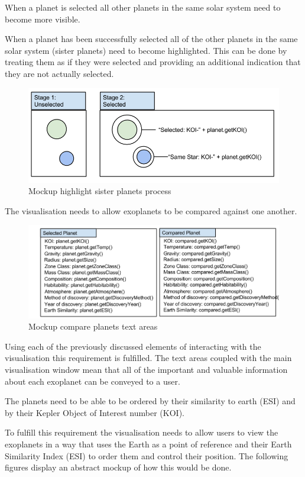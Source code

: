 \begin{enumerate}
When a planet is selected all other planets in the same solar system
need to become more visible.

When a planet has been successfully selected all of the other planets in the
same solar system (sister planets) need to become highlighted. This can be done
by treating them as if they were selected and providing an additional indication
that they are not actually selected.  
\begin{figure}[H]
  \centering
      \includegraphics[width=.8\textwidth]{images/selectedSisterPlanets.png}
  \caption{Mockup highlight sister planets process}  
\end{figure}

{\bf
 \item[R2.] The visualisation needs to allow exoplanets to be compared against
one another.}

\begin{figure}[H]
  \centering
      \includegraphics[width=.7\textwidth]{images/mockComparePlanets.png}
  \caption{Mockup compare planets text areas}  
\end{figure}

Using each of the previously discussed elements of interacting with the
visualisation this requirement is fulfilled. The text areas coupled with the
main visualisation window mean that all of the important and valuable
information about each exoplanet can be conveyed to a user.

{\bf
 \item[R3.] The planets need to be able to be ordered by their similarity to
earth (ESI) and by their Kepler Object of Interest number (KOI).}

To fulfill this requirement the visualisation needs to allow users to view the
exoplanets in a way that uses the Earth as a point of reference and their Earth
Similarity Index (ESI) to order them and control their position. The following
figures display an abstract mockup of how this would be done.


\end{enumerate}
